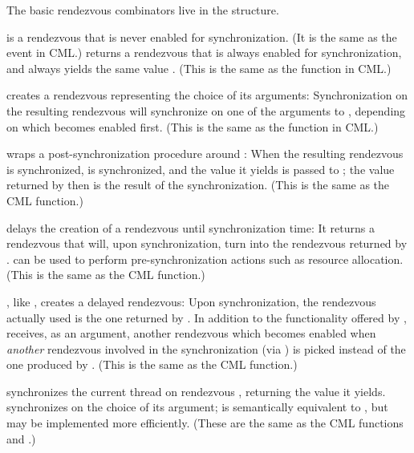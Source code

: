 The basic rendezvous combinators live in the 
structure.
%
\begin{protos}
\end{protos}
%
 is a rendezvous that is never enabled for
synchronization.  (It is the same as the  event in CML.)
 returns a rendezvous that is always enabled for
synchronization, and always yields the same value .  (This
is the same as the  function in CML.)
%
\begin{protos}
\end{protos}
%
 creates a rendezvous representing the choice of its
arguments:  Synchronization on the resulting rendezvous will
synchronize on one of the arguments to , depending on
which becomes enabled first.  (This is the same as the 
function in CML.)
%
\begin{protos}
\end{protos}
%
 wraps a post-synchronization procedure around :
When the resulting rendezvous is synchronized,  is
synchronized, and the value it yields is passed to ; the
value returned by  then is the result of the
synchronization.  (This is the same as the CML  function.)
%
\begin{protos}
\end{protos}
%
 delays the creation of a rendezvous until synchronization
time: It returns a rendezvous that will, upon synchronization, turn
into the rendezvous returned by .   can be
used to perform pre-synchronization actions such as resource
allocation.  (This is the same as the CML  function.)
%
\begin{protos}
\end{protos}
%
, like , creates a delayed rendezvous: Upon
synchronization, the rendezvous actually used is the one returned by
.  In addition to the functionality offered by
,  receives, as an argument, another rendezvous
which becomes enabled when \emph{another} rendezvous involved in the
synchronization (via ) is picked instead of the one
produced by .  (This is the same as the CML 
function.)
%
\begin{protos}
\end{protos}
%
 synchronizes the current thread on rendezvous
, returning the value it yields.  
synchronizes on the choice of its argument;  is semantically equivalent to , but may be implemented more efficiently.  (These are the
same as the CML functions  and .)

